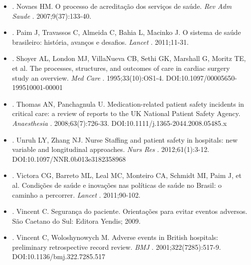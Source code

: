 \documentclass{article}
\begin{document}
\begin{itemize}
\item[%
15] %
. Novaes HM. O processo de acreditação dos serviços de saúde. %
\textit{Rev
            Adm Saude}
 . 2007;9(37):133-40.  

\item[%
16] %
. Paim J, Travassos C, Almeida C, Bahia L, Macinko J. O sistema de saúde
          brasileiro: história, avanços e desafios. %
\textit{Lancet}
 .
          2011;11-31.  

\item[%
17] %
. Shoyer AL, London MJ, VillaNueva CB, Sethi GK, Marshall G, Moritz TE, et
          al. The processes, structures, and outcomes of care in cardiac surgery study an overview.
\textit{Med Care}
 . 1995;33(10):OS1-4.
          DOI:10.1097/00005650-199510001-00001  

\item[%
18] %
. Thomas AN, Panchagnula U. Medication-related patient safety incidents in
          critical care: a review of reports to the UK National Patient Safety Agency.
\textit{Anaesthesia}
 . 2008;63(7):726-33.
          DOI:10.1111/j.1365-2044.2008.05485.x  

\item[%
19] %
. Unruh LY, Zhang NJ. Nurse Staffing and patient safety in hospitals: new
          variable and longitudinal approaches. %
\textit{Nurs Res}
 . 2012;61(1):3-12.
          DOI:10.1097/NNR.0b013e3182358968  

\item[%
20] %
. Victora CG, Barreto ML, Leal MC, Monteiro CA, Schmidt MI, Paim J, et al.
          Condições de saúde e inovações nas políticas de saúde no Brasil: o caminho a percorrer.
\textit{Lancet}
 . 2011;90-102.  

\item[%
21] %
. Vincent C. Segurança do paciente. Orientações para evitar eventos
          adversos. São Caetano do Sul: Editora Yendis; 2009.  

\item[%
22] %
. Vincent C, Woloshynowych M. Adverse events in British hospitals:
          preliminary retrospective record review. %
\textit{BMJ}
 . 2001;322(7285):517-9.
          DOI:10.1136/bmj.322.7285.517  


\end{itemize}
\end{document}
